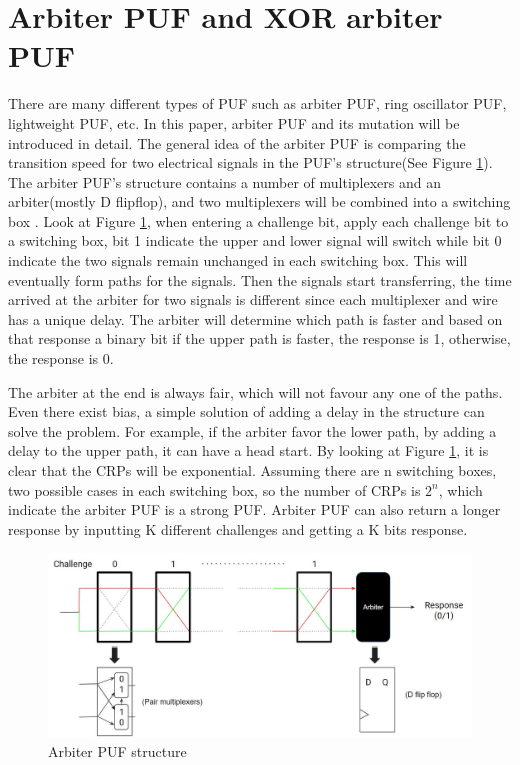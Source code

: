 \section{Arbiter PUF and XOR arbiter PUF}
There are many different types of PUF such as arbiter PUF, ring oscillator PUF, lightweight PUF, etc. In this paper, arbiter PUF and its mutation will be introduced in detail. The general idea of
the arbiter PUF is comparing the transition speed for two electrical signals in the PUF's structure(See Figure \ref{fig:figure6}). The arbiter PUF's structure contains a number of 
multiplexers and an arbiter(mostly D flipflop), and two multiplexers will be combined into a switching box \cite{Reference3}. Look at Figure \ref{fig:figure6}, when entering a challenge bit, apply each challenge bit to a switching box, bit 1 indicate the upper and lower signal will switch 
while bit 0 indicate the two signals remain unchanged in each switching box. This will eventually form paths for the signals. Then the signals start transferring, the time arrived at the arbiter for two signals 
is different since each multiplexer and wire has a unique delay. The arbiter will determine which path is faster and based on that response a binary bit if the upper path is faster, the response is 1, 
otherwise, the response is 0. \par

The arbiter at the end is always fair, which will not favour any one of the paths. Even there exist bias, a simple solution of adding a delay in the structure can solve the problem. For example, if the arbiter favor the lower path,
by adding a delay to the upper path, it can have a head start. By looking at Figure \ref{fig:figure6}, it is clear that the CRPs will be exponential. Assuming there are n switching boxes, two possible cases in each switching box, so the 
number of CRPs is $2^{n}$, which indicate the arbiter PUF is a strong PUF. Arbiter PUF can also return a longer response by inputting K different challenges and getting a K bits response.

\begin{figure}[htp]
    \centering
    \includegraphics[width=12cm]{figures/figure6.jpg}
    \caption{Arbiter PUF structure}
    \label{fig:figure6}
    \end{figure}

